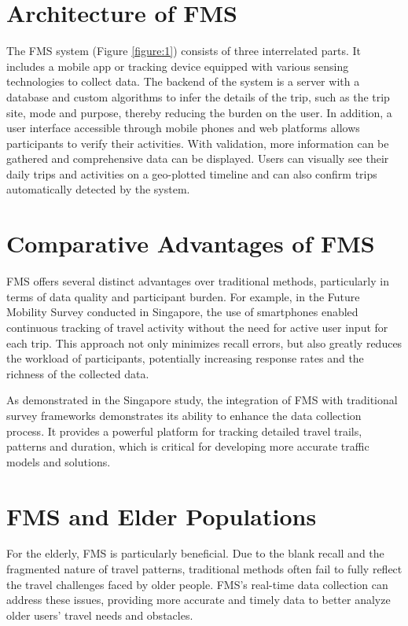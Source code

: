 \documentclass[12pt,two side]{report}
\begin{document}
\section{Architecture of FMS}
The FMS system (Figure \ref{figure:1}) consists of three interrelated parts. It includes a mobile app or tracking device equipped with various sensing technologies to collect data. The backend of the system is a server with a database and custom algorithms to infer the details of the trip, such as the trip site, mode and purpose, thereby reducing the burden on the user. In addition, a user interface accessible through mobile phones and web platforms allows participants to verify their activities. With validation, more information can be gathered and comprehensive data can be displayed. Users can visually see their daily trips and activities on a geo-plotted timeline and can also confirm trips automatically detected by the system.
\section{Comparative Advantages of FMS}
FMS offers several distinct advantages over traditional methods, particularly in terms of data quality and participant burden. For example, in the Future Mobility Survey conducted in Singapore, the use of smartphones enabled continuous tracking of travel activity without the need for active user input for each trip. This approach not only minimizes recall errors, but also greatly reduces the workload of participants, potentially increasing response rates and the richness of the collected data.\newline

As demonstrated in the Singapore study, the integration of FMS with traditional survey frameworks demonstrates its ability to enhance the data collection process. It provides a powerful platform for tracking detailed travel trails, patterns and duration, which is critical for developing more accurate traffic models and solutions.
\section{FMS and Elder Populations}
For the elderly, FMS is particularly beneficial. Due to the blank recall and the fragmented nature of travel patterns, traditional methods often fail to fully reflect the travel challenges faced by older people. FMS's real-time data collection can address these issues, providing more accurate and timely data to better analyze older users' travel needs and obstacles.
\end{document}
